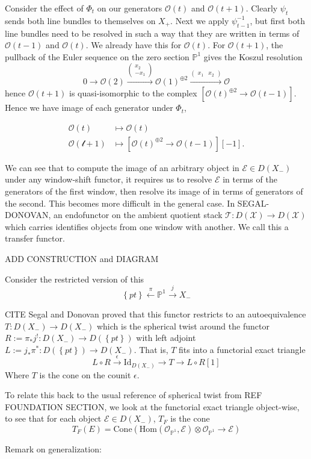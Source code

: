 Consider the effect of $\Phi_t$ on our generators $\mathcal{O}(t)$ and $\mathcal{O}(t+1)$. Clearly $\psi_t$ sends both line bundles to themselves on $X_{+}$. Next we apply $\psi_{t-1}^{-1}$, but first both line bundles need to be resolved in such a way that they are written in terms of $\mathcal{O}(t-1)$ and $\mathcal{O}(t)$. We already have this for $\mathcal{O}(t)$. For $\mathcal{O}(t+1)$, the pullback of the Euler sequence on the zero section $\mathbb{P}^1$ gives the Koszul resolution $$0\to \mathcal{O}(2)\xrightarrow{\begin{pmatrix}x_2\\-x_{1}\end{pmatrix}}\mathcal{O}(1)^{\oplus 2}\xrightarrow{\begin{pmatrix}x_{1}&x_2\end{pmatrix}} \mathcal{O}$$ hence $\mathcal{O}(t+1)$ is quasi-isomorphic to the complex $\left[ \mathcal{O}(t)^{\oplus{2}}\to \mathcal{O}(t-1) \right]$. Hence we have image of each generator under $\Phi_t$, 

\begin{align*}
\mathcal{O}(t) &\mapsto \mathcal{O}(t)\\
\mathcal{\mathcal{O}(t+1)}&\mapsto\left[ \mathcal{O}(t)^{\oplus 2}\to \mathcal{O}(t-1) \right][-1] .
\end{align*}

We can see that to compute the image of an arbitrary object in $\mathcal{E} \in D(X_-)$ under any window-shift functor, it requires us to resolve $\mathcal{E}$ in terms of the generators of the first window, then resolve its image of in terms of generators of the second. This becomes more difficult in the general case. In SEGAL-DONOVAN, an endofunctor on the ambient quotient stack $\mathcal{T}: D(\mathcal{X})\to D(\mathcal{X})$ which carries identifies objects from one window with another. We call this a transfer functor. 

ADD CONSTRUCTION and DIAGRAM

Consider the restricted version of this  $$\left\{ pt \right\} \xleftarrow{\pi} \mathbb{P}^{1}\xrightarrow{j} X_{-}$$

CITE Segal and Donovan proved that this functor restricts to an autoequivalence $T: D(X_{-})\to D(X_-)$ which is the spherical twist around the functor $R := \pi_{*}j^{!} : D(X_{-})\to D(\left\{ pt \right\})$ with left adjoint $L := j_{*} \pi^{*}: D( \left\{ pt \right\})\to D(X_{-})$. That is, $T$ fits into a functorial exact triangle $$L\circ R \xrightarrow{\epsilon} \mathrm{Id}_{D(X_{-})} \to T\to L\circ R[1]$$ Where $T$ is the cone on the counit $\epsilon$.  

To relate this back to the usual reference of spherical twist from REF FOUNDATION SECTION, we look at the functorial exact triangle object-wise, to see that for each object $\mathcal{E}\in D(X_-)$, $T_F$ is the cone $$T_{F}(E) = \mathrm{Cone}\left( \mathrm{Hom}(\mathcal{O}_{\mathbb{P}^{1}},\mathcal{E}) \otimes  \mathcal{O}_{\mathbb{P}^{1}} \to \mathcal{E}\right) $$

Remark on generalization:



